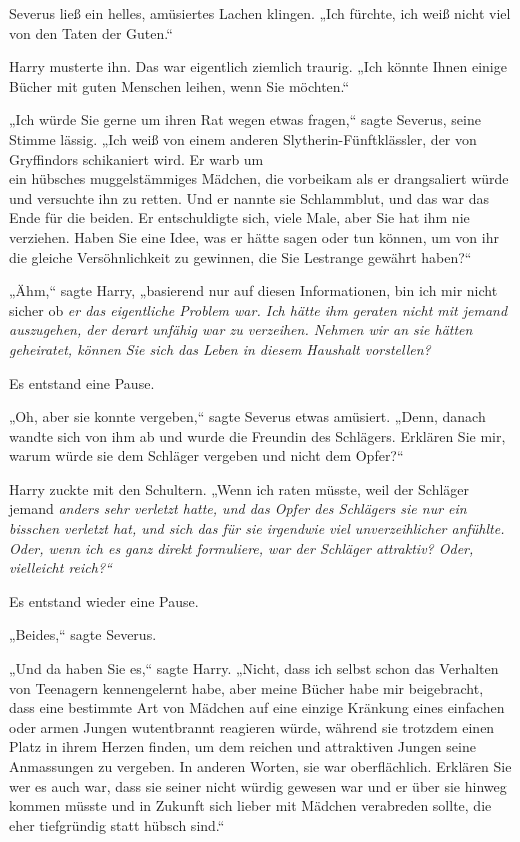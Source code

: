 {Severus ließ ein helles, amüsiertes Lachen klingen. „Ich fürchte, ich weiß nicht viel von den Taten der Guten.“

Harry musterte ihn. Das war eigentlich ziemlich traurig. „Ich könnte Ihnen einige Bücher mit guten Menschen leihen, wenn Sie möchten.“

„Ich würde Sie gerne um ihren Rat wegen etwas fragen,“ sagte Severus, seine Stimme lässig. „Ich weiß von einem anderen Slytherin-Fünftklässler, der von Gryffindors schikaniert wird. Er warb um\\ ein hübsches muggelstämmiges Mädchen, die vorbeikam als er drangsaliert würde und versuchte ihn zu retten. Und er nannte sie Schlammblut, und das war das Ende für die beiden. Er entschuldigte sich, viele Male, aber Sie hat ihm nie verziehen. Haben Sie eine Idee, was er hätte sagen oder tun können, um von ihr die gleiche Versöhnlichkeit zu gewinnen, die Sie Lestrange gewährt haben?“

„Ähm,“ sagte Harry, „basierend nur auf diesen Informationen, bin ich mir nicht sicher ob \emph{er das eigentliche Problem war. Ich hätte ihm geraten nicht mit jemand auszugehen, der derart unfähig war zu verzeihen. Nehmen wir an sie hätten geheiratet, können Sie sich das Leben in diesem Haushalt vorstellen?}

Es entstand eine Pause.

„Oh, aber sie konnte vergeben,“ sagte Severus etwas amüsiert. „Denn, danach wandte sich von ihm ab und wurde die Freundin des Schlägers. Erklären Sie mir, warum würde sie dem Schläger vergeben und nicht dem Opfer?“

Harry zuckte mit den Schultern. „Wenn ich raten müsste, weil der Schläger jemand \emph{anders sehr verletzt hatte, und das Opfer des Schlägers \emph{sie} nur ein bisschen verletzt hat, und sich das für sie irgendwie viel unverzeihlicher anfühlte. Oder, wenn ich es ganz direkt formuliere, war der Schläger attraktiv? Oder, vielleicht reich?“}

Es entstand wieder eine Pause.

„Beides,“ sagte Severus.

„Und da haben Sie es,“ sagte Harry. „Nicht, dass ich selbst schon das Verhalten von Teenagern kennengelernt habe, aber meine Bücher habe mir beigebracht, dass eine bestimmte Art von Mädchen auf eine einzige Kränkung eines einfachen oder armen Jungen wutentbrannt reagieren würde, während sie trotzdem einen Platz in ihrem Herzen finden, um dem reichen und attraktiven Jungen seine Anmassungen zu vergeben. In anderen Worten, sie war oberflächlich. Erklären Sie wer es auch war, dass sie seiner nicht würdig gewesen war und er über sie hinweg kommen müsste und in Zukunft sich lieber mit Mädchen verabreden sollte, die eher tiefgründig statt hübsch sind.“

}
